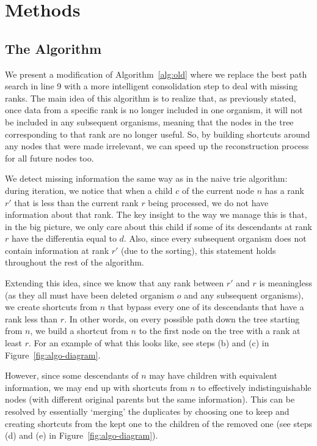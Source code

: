 \section{Methods} \label{sec:methods}

\subsection{The Algorithm} \label{sec:algorithm}

We present a modification of Algorithm~\ref{alg:old} where we replace the best path search in line 9 with a more intelligent consolidation step to deal with missing ranks. The main idea of this algorithm is to realize that, as previously stated, once data from a specific rank is no longer included in one organism, it will not be included in any subsequent organisms, meaning that the nodes in the tree corresponding to that rank are no longer useful. So, by building shortcuts around any nodes that were made irrelevant, we can speed up the reconstruction process for all future nodes too.

We detect missing information the same way as in the naive trie algorithm: during iteration, we notice that when a child $c$ of the current node $n$ has a rank $r'$ that is less than the current rank $r$ being processed, we do not have information about that rank. The key insight to the way we manage this is that, in the big picture, we only care about this child if some of its descendants at rank $r$ have the differentia equal to $d$. Also, since every subsequent organism does not contain information at rank $r'$ (due to the sorting), this statement holds throughout the rest of the algorithm.



Extending this idea, since we know that any rank between $r'$ and $r$ is meaningless (as they all must have been deleted organism $o$ and any subsequent organisms), we create shortcuts from $n$ that bypass every one of its descendants that have a rank less than $r$. In other words, on every possible path down the tree starting from $n$, we build a shortcut from $n$ to the first node on the tree with a rank at least $r$. For an example of what this looks like, see steps (b) and (c) in Figure~\ref{fig:algo-diagram}. 

However, since some descendants of $n$ may have children with equivalent information, we may end up with shortcuts from $n$ to effectively indistinguishable nodes (with different original parents but the same information). This can be resolved by essentially `merging' the duplicates by choosing one to keep and creating shortcuts from the kept one to the children of the removed one (see steps (d) and (e) in Figure~\ref{fig:algo-diagram}).

